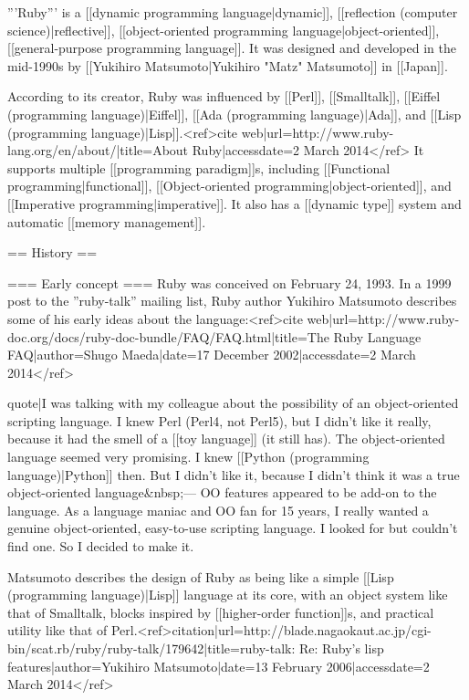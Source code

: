 '''Ruby''' is a [[dynamic programming language|dynamic]], [[reflection (computer science)|reflective]], [[object-oriented programming language|object-oriented]], [[general-purpose programming language]]. It was designed and developed in the mid-1990s by [[Yukihiro Matsumoto|Yukihiro "Matz" Matsumoto]] in [[Japan]].

According to its creator, Ruby was influenced by [[Perl]], [[Smalltalk]], [[Eiffel (programming language)|Eiffel]], [[Ada (programming language)|Ada]], and [[Lisp (programming language)|Lisp]].<ref>{{cite web|url=http://www.ruby-lang.org/en/about/|title=About Ruby|accessdate=2 March 2014}}</ref> It supports multiple [[programming paradigm]]s, including [[Functional programming|functional]], [[Object-oriented programming|object-oriented]], and [[Imperative programming|imperative]]. It also has a [[dynamic type]] system and automatic [[memory management]].

== History ==

=== Early concept ===
Ruby was conceived on February 24, 1993. In a 1999 post to the ''ruby-talk'' mailing list, Ruby author Yukihiro Matsumoto describes some of his early ideas about the language:<ref>{{cite web|url=http://www.ruby-doc.org/docs/ruby-doc-bundle/FAQ/FAQ.html|title=The Ruby Language FAQ|author=Shugo Maeda|date=17 December 2002|accessdate=2 March 2014}}</ref>

{{quote|I was talking with my colleague about the possibility of an object-oriented scripting language. I knew Perl (Perl4, not Perl5), but I didn't like it really, because it had the smell of a [[toy language]] (it still has). The object-oriented language seemed very promising. I knew [[Python (programming language)|Python]] then. But I didn't like it, because I didn't think it was a true object-oriented language&nbsp;— OO features appeared to be add-on to the language. As a language maniac and OO fan for 15 years, I really wanted a genuine object-oriented, easy-to-use scripting language. I looked for but couldn't find one. So I decided to make it.}}

Matsumoto describes the design of Ruby as being like a simple [[Lisp (programming language)|Lisp]] language at its core, with an object system like that of Smalltalk, blocks inspired by [[higher-order function]]s, and practical utility like that of Perl.<ref>{{citation|url=http://blade.nagaokaut.ac.jp/cgi-bin/scat.rb/ruby/ruby-talk/179642|title=ruby-talk: Re: Ruby's lisp features|author=Yukihiro Matsumoto|date=13 February 2006|accessdate=2 March 2014}}</ref>

